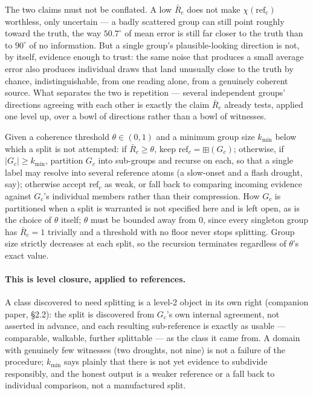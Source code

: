 \documentclass[12pt, a4paper]{article}
\begin{document}
The two claims must not be conflated. A low $\bar R_c$ does not make
$\chi(\mathrm{ref}_c)$ worthless, only uncertain --- a badly
scattered group can still point roughly toward the truth, the way
$50.7^\circ$ of mean error is still far closer to the truth than to
$90^\circ$ of no information. But a single group's plausible-looking
direction is not, by itself, evidence enough to trust: the same
noise that produces a small average error also produces individual
draws that land unusually close to the truth by chance,
indistinguishable, from one reading alone, from a genuinely coherent
source. What separates the two is repetition --- several independent
groups' directions agreeing with each other is exactly the claim
$\bar R_c$ already tests, applied one level up, over a bowl of
directions rather than a bowl of witnesses.

Given a coherence threshold $\theta\in(0,1)$ and a minimum
group size $k_{\min}$ below which a split is not attempted: if
$\bar R_c\ge\theta$, keep $\mathrm{ref}_c=\boxplus(G_c)$; otherwise, if
$|G_c|\ge k_{\min}$, partition $G_c$ into sub-groups and recurse on
each, so that a single label may resolve into several reference atoms
(a slow-onset and a flash drought, say); otherwise accept
$\mathrm{ref}_c$ as weak, or fall back to comparing incoming evidence
against $G_c$'s individual members rather than their compression. How
$G_c$ is partitioned when a split is warranted is not specified here
and is left open, as is the choice of $\theta$ itself; $\theta$ must
be bounded away from $0$, since every singleton group has $\bar
R_c=1$ trivially and a threshold with no floor never stops splitting.
Group size strictly decreases at each split, so the recursion
terminates regardless of $\theta$'s exact value.

\paragraph{This is level closure, applied to references.} A class
discovered to need splitting is a level-2 object in its own right
(companion paper, \S2.2): the split is discovered from $G_c$'s own
internal agreement, not asserted in advance, and each resulting
sub-reference is exactly as usable --- comparable, walkable, further
splittable --- as the class it came from. A domain with genuinely
few witnesses (two droughts, not nine) is not a failure of the
procedure; $k_{\min}$ says plainly that there is not yet evidence to
subdivide responsibly, and the honest output is a weaker reference or
a fall back to individual comparison, not a manufactured split.
\end{document}

